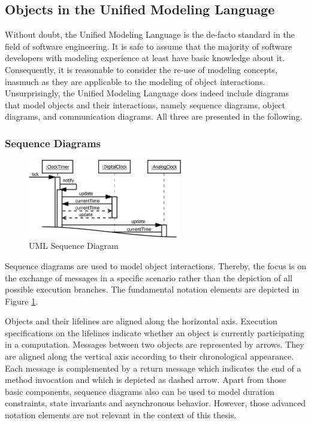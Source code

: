 \subsection{Objects in the Unified Modeling Language}
\label{ss:BackgroundModelingUML}
Without doubt, the Unified Modeling Language is the de-facto standard in the field of software engineering.
It is safe to assume that the majority of software developers with modeling experience at least have basic knowledge about it.
Consequently, it is reasonable to consider the re-use of modeling concepts, inasmuch as they are applicable to the modeling of object interactions.
Unsurprisingly, the Unified Modeling Language does indeed include diagrams that model objects and their interactions, namely sequence diagrams, object diagrams, and communication diagrams.
All three are presented in the following.

\subsubsection{Sequence Diagrams}

\begin{figure}
	\centering
	\includegraphics[width=0.6\textwidth]{../images/02-Sequence}
	\caption{UML Sequence Diagram}
	\label{fig:BackgroundModelingSequence}
\end{figure}

Sequence diagrams \cite{rumbaugh_unified_2010} are used to model object interactions.
Thereby, the focus is on the exchange of messages in a specific scenario rather than the depiction of all possible execution branches.
The fundamental notation elements are depicted in Figure \ref{fig:BackgroundModelingSequence}.

Objects and their lifelines are aligned along the horizontal axis.
Execution specifications on the lifelines indicate whether an object is currently participating in a computation.
Messages between two objects are represented by arrows.
They are aligned along the vertical axis according to their chronological appearance.
Each message is complemented by a return message which indicates the end of a method invocation and which is depicted as dashed arrow.
Apart from those basic components, sequence diagrams also can be used to model duration constraints, state invariants and asynchronous behavior.
However, those advanced notation elements are not relevant in the context of this thesis.

